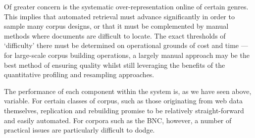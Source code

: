 Of greater concern is the systematic over-representation online of certain genres.  This implies that automated retrieval must advance significantly in order to sample many corpus designs, or that it must be complemented by manual methods where documents are difficult to locate.  The exact thresholds of `difficulty' there must be determined on operational grounds of cost and time --- for large-scale corpus building operations, a largely manual approach may be the best method of ensuring quality whilst still leveraging the benefits of the quantitative profiling and resampling approaches.


\noindent\makebox[\linewidth]{\rule{\paperwidth}{0.4pt}}






%
%
The performance of each component within the system is, as we have seen above, variable.  For certain classes of corpus, such as those originating from web data themselves, replication and rebuilding promise to be relatively straight-forward and easily automated.  For corpora such as the BNC, however, a number of practical issues are particularly difficult to dodge.








